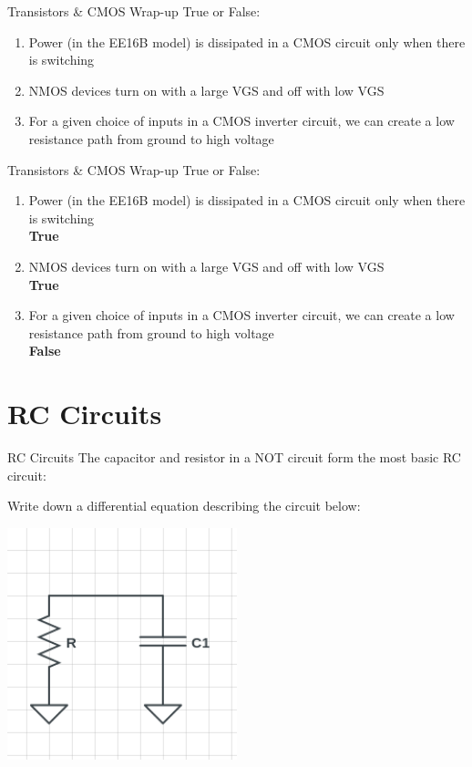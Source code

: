\documentclass{beamer}
\begin{document}
	\begin{frame}{Transistors \& CMOS Wrap-up}
	    True or False:
	    \begin{enumerate}
	        \item Power (in the EE16B model) is dissipated in a CMOS circuit only when there is switching \\
	        \textbf{}
	        \item NMOS devices turn on with a large VGS and off with low VGS \\
	        \textbf{}
            \item For a given choice of inputs in a CMOS inverter circuit, we can create a low resistance path from ground to high voltage \\
            \textbf{}
	    \end{enumerate}
	\end{frame}
	
	\begin{frame}{Transistors \& CMOS Wrap-up}
	    True or False:
	    \begin{enumerate}
	        \item Power (in the EE16B model) is dissipated in a CMOS circuit only when there is switching \\
	        \textbf{True}
	        \item NMOS devices turn on with a large VGS and off with low VGS \\
	        \textbf{True}
            \item For a given choice of inputs in a CMOS inverter circuit, we can create a low resistance path from ground to high voltage \\
            \textbf{False}
	    \end{enumerate}
	\end{frame}
	
	\section{RC Circuits}
	
	\begin{frame}{RC Circuits}
    	The capacitor and resistor in a NOT circuit form the most basic RC circuit:
        
        Write down a differential equation describing the circuit below:

	    \begin{center}
	        \includegraphics[width=0.5\textwidth]{rc-circuits-1.png}
	    \end{center}
	\end{frame}
	
\end{document}
